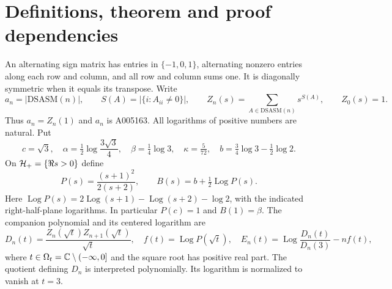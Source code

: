 \documentclass[11pt,letterpaper]{article}
\theoremstyle{remark}\newtheorem{remark}[theorem]{Remark}
\newcommand{\DS}{\mathrm{DSASM}}\newcommand{\ASM}{\mathrm{ASM}}
\DeclareMathOperator{\Log}{Log}\DeclareMathOperator{\Var}{Var}
\begin{document}
\section{Definitions, theorem and proof dependencies}\label{dsasm:sec:main}
An alternating sign matrix has entries in $\{-1,0,1\}$, alternating
nonzero entries along each row and column, and all row and column sums
one. It is diagonally symmetric when it equals its transpose. Write
\[
 a_n=|\DS(n)|,\qquad S(A)=|\{i:A_{ii}\ne0\}|,\qquad
 Z_n(s)=\sum_{A\in\DS(n)}s^{S(A)},\qquad Z_0(s)=1.
\]
Thus $a_n=Z_n(1)$ and $a_n$ is A005163. All logarithms of positive
numbers are natural. Put
\begin{equation}\label{dsasm:constants}
 c=\sqrt3,\quad \alpha=\tfrac12\log\frac{3\sqrt3}{4},\quad
 \beta=\tfrac14\log3,\quad \kappa=\tfrac5{72},\quad
 b=\tfrac34\log3-\tfrac12\log2.
\end{equation}
On $\mathcal H_+=\{\Re s>0\}$ define
\begin{equation}\label{dsasm:pressure}
 P(s)=\frac{(s+1)^2}{2(s+2)},\qquad
 B(s)=b+\tfrac12\Log P(s).
\end{equation}
Here $\Log P(s)=2\Log(s+1)-\Log(s+2)-\log2$, with the indicated
right-half-plane logarithms. In particular $P(c)=1$ and $B(1)=\beta$.
The companion polynomial and its centered logarithm are
\begin{equation}\label{dsasm:companiondefs}
 D_n(t)=\frac{Z_n(\sqrt t)Z_{n+1}(\sqrt t)}{\sqrt t},\quad
 f(t)=\Log P(\sqrt t),\quad
 E_n(t)=\Log\frac{D_n(t)}{D_n(3)}-nf(t),
\end{equation}
where $t\in\Omega_t=\mathbb C\setminus(-\infty,0]$ and the square root
has positive real part. The quotient defining $D_n$ is interpreted
polynomially. Its logarithm is normalized to vanish at $t=3$.
\end{document}
